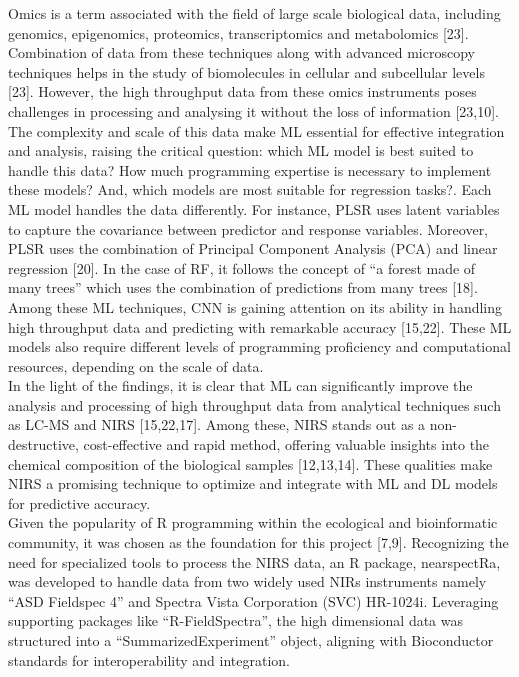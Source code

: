 \documentclass[12pt,a4paper]{article}
\begin{document}
Omics is a term associated with the field of large scale biological data, including genomics, epigenomics, proteomics, transcriptomics and metabolomics [23]. Combination of data from these techniques along with advanced microscopy techniques helps in the study of biomolecules in cellular and subcellular levels [23]. However, the high throughput data from these omics instruments poses challenges in processing and analysing it without the loss of information [23,10]. 
The complexity and scale of this data make ML essential for effective integration and analysis, raising the critical question: which ML model is best suited to handle this data? How much programming expertise is necessary to implement these models? And, which models are most suitable for regression tasks?. Each ML model handles the data differently. For instance, PLSR uses latent variables to capture the covariance between predictor and response variables. Moreover, 
PLSR uses the combination of Principal Component Analysis (PCA) and linear regression [20]. In the case of RF, it follows the concept of “a forest made of many trees” which uses the combination of predictions from many trees [18]. Among these ML techniques, CNN is gaining attention on its ability in handling high throughput data and predicting with remarkable accuracy [15,22]. These ML models also require different levels of programming proficiency and computational resources, depending on the scale of data. \\


In the light of the findings, it is clear that ML can significantly improve the analysis and processing of high throughput data from analytical techniques such as LC-MS and NIRS [15,22,17]. Among these, NIRS stands out as a non-destructive, cost-effective and rapid method, offering valuable insights into the chemical composition of the biological samples [12,13,14]. These qualities make NIRS a promising technique to optimize and integrate with ML and DL models for predictive accuracy. \\


Given the popularity of R programming within the ecological and bioinformatic community, it was chosen as the foundation for this project [7,9]. Recognizing the need for specialized tools to process the NIRS data, an R package, nearspectRa, was developed to handle data from two widely used NIRs instruments namely “ASD Fieldspec 4” and Spectra Vista Corporation (SVC) HR-1024i. 
Leveraging supporting packages like “R-FieldSpectra”, the high dimensional data was structured into a “SummarizedExperiment” object, aligning with Bioconductor standards for interoperability and integration. \\
\end{document}
